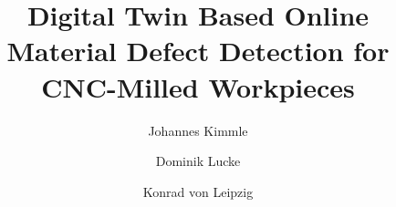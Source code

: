 \documentclass[5p,times,procedia]{elsarticle}
\begin{document}
\begin{frontmatter}






\title{Digital Twin Based Online Material Defect Detection for CNC-Milled Workpieces}




\author[a,b]{Johannes Kimmle} 
\author[a,c]{Dominik Lucke}%
\author[b]{Konrad von Leipzig}

\address[a]{ESB Business School, Reutlingen University, Alteburgstra\ss e 150, 72762 Reutlingen, Germany}
\address[b]{Department of Industrial Engineering, Stellenbosch University, Joubert Street, Stellenbosch, 7600, South Africa}
\address[c]{Fraunhofer Institute for Manufacturing Engineering and Automation IPA, Nobelstra\ss e 12, 70569 Stuttgart, Germany}



\end{frontmatter}
\end{document}
